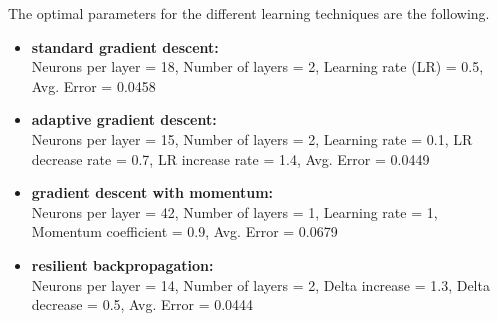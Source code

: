 \documentclass{article}
\begin{document}
The optimal parameters for the different learning techniques are the following.
\begin{itemize}
\item \textbf{standard gradient descent:} \\ Neurons per layer = 18, Number of layers = 2, Learning rate (LR) = 0.5, Avg. Error = 0.0458
\item \textbf{adaptive gradient descent:}\\ Neurons per layer = 15, Number of layers = 2, Learning rate = 0.1, LR decrease rate = 0.7, LR increase rate = 1.4, Avg. Error = 0.0449
\item \textbf{gradient descent with momentum:}\\ Neurons per layer = 42, Number of layers = 1, Learning rate = 1, Momentum coefficient = 0.9, Avg. Error = 0.0679
\item \textbf{resilient backpropagation:}\\ Neurons per layer = 14, Number of layers = 2, Delta increase = 1.3, Delta decrease = 0.5, Avg. Error = 0.0444
\end{itemize}
\end{document}
